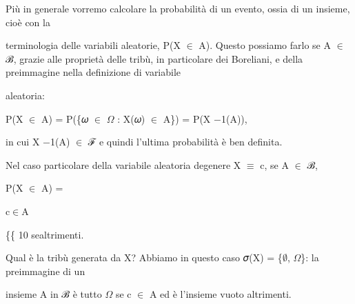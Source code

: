 \documentclass[a4paper,portrait,12pt]{article}
\begin{document}
\begin{flushleft}
Più in generale vorremo calcolare la probabilit\`{a} di un evento, ossia di un insieme, cio\`{e} con la
\end{flushleft}


\begin{flushleft}
terminologia delle variabili aleatorie, P(X $\in$ A). Questo possiamo farlo se A $\in$ ℬ, grazie alle propriet\`{a} delle tribù, in particolare dei Boreliani, e della preimmagine nella definizione di variabile
\end{flushleft}


\begin{flushleft}
aleatoria:
\end{flushleft}


\begin{flushleft}
P(X $\in$ A) = P(\{𝜔 $\in$ $\Omega$ : X(𝜔) $\in$ A\}) = P(X $-$1(A)),
\end{flushleft}


\begin{flushleft}
in cui X $-$1(A) $\in$ ℱ e quindi l'ultima probabilit\`{a} \`{e} ben definita.
\end{flushleft}


\begin{flushleft}
Nel caso particolare della variabile aleatoria degenere X $\equiv$ c, se A $\in$ ℬ,
\end{flushleft}


\begin{flushleft}
P(X $\in$ A) =
\end{flushleft}





\begin{flushleft}
c$\in$A
\end{flushleft}


\begin{flushleft}
\{\{ 10 sealtrimenti.
\end{flushleft}





\begin{flushleft}
Qual \`{e} la tribù generata da X? Abbiamo in questo caso 𝜎(X) = \{$\emptyset$, $\Omega$\}: la preimmagine di un
\end{flushleft}


\begin{flushleft}
insieme A in ℬ \`{e} tutto $\Omega$ se c $\in$ A ed \`{e} l'insieme vuoto altrimenti.
\end{flushleft}
\end{document}
